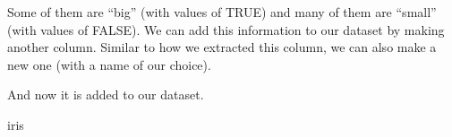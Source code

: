 \documentclass[
  letterpaper,
  DIV=11,
  numbers=noendperiod]{scrreprt}
\newenvironment{Shaded}{\begin{snugshade}}{\end{snugshade}}
\newcommand{\DecValTok}[1]{\textcolor[rgb]{0.68,0.00,0.00}{#1}}
\newcommand{\NormalTok}[1]{\textcolor[rgb]{0.00,0.23,0.31}{#1}}
\newcommand{\OtherTok}[1]{\textcolor[rgb]{0.00,0.23,0.31}{#1}}
\newcommand{\SpecialCharTok}[1]{\textcolor[rgb]{0.37,0.37,0.37}{#1}}
\begin{document}
Some of them are ``big'' (with values of TRUE) and many of them are
``small'' (with values of FALSE). We can add this information to our
dataset by making another column. Similar to how we extracted this
column, we can also make a new one (with a name of our choice).

\begin{Shaded}
\end{Shaded}

And now it is added to our dataset.

\begin{Shaded}
\begin{Highlighting}[]
\NormalTok{iris}
\end{Highlighting}
\end{Shaded}
\end{document}
